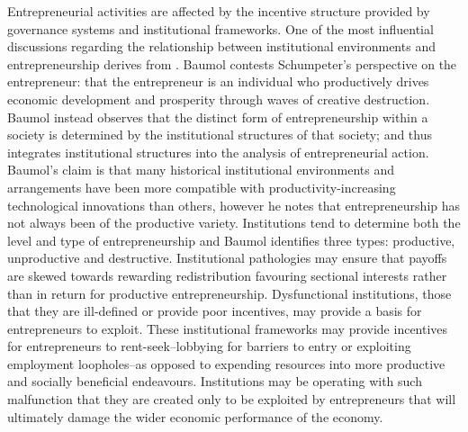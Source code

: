 Entrepreneurial activities are affected by the incentive structure provided by governance systems and institutional frameworks. One of the most influential discussions regarding the relationship between institutional environments and entrepreneurship derives from \citet{Baumol1990}. Baumol contests Schumpeter's perspective on the entrepreneur: that the entrepreneur is an individual who productively drives economic development and prosperity through waves of creative destruction. Baumol instead observes that the distinct form of entrepreneurship within a society is determined by the institutional structures of that society; and thus integrates institutional structures into the analysis of entrepreneurial action. Baumol's claim is that many historical institutional environments and arrangements have been more compatible with productivity-increasing technological innovations than others, however he notes that entrepreneurship has not always been of the productive variety. Institutions tend to determine both the level and type of entrepreneurship and Baumol identifies three types: productive, unproductive and destructive. Institutional pathologies may ensure that payoffs are skewed towards rewarding redistribution favouring sectional interests rather than in return for productive entrepreneurship. Dysfunctional institutions, those that they are ill-defined or provide poor incentives, may provide a basis for entrepreneurs to exploit. These institutional frameworks may provide incentives for entrepreneurs to rent-seek--lobbying for barriers to entry or exploiting employment loopholes--as opposed to expending resources into more productive and socially beneficial endeavours. Institutions may be operating with such malfunction that they are created only to be exploited by entrepreneurs that will ultimately damage the wider economic performance of the economy.

